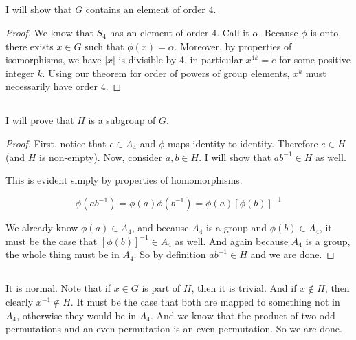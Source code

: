 \documentclass[a4paper,12pt]{article}
\numberwithin{equation}{section}
\begin{document}
\subsection{}
I will show that $G$ contains an element of order 4.

\begin{proof}
We know that $S_4$ has an element of order 4. Call it $\alpha$. Because $\phi$ is onto, there exists $x \in G$ such that $\phi(x) = \alpha$. Moreover, by properties of isomorphisms, we have $|x|$ is divisible by 4, in particular $x^{4k} = e$ for some positive integer $k$. Using our theorem for order of powers of group elements, $x^k$ must necessarily have order 4.
\end{proof}

\subsection{}

I will prove that $H$ is a subgroup of $G$.
\begin{proof}
First, notice that $e \in A_4$ and $\phi$ maps identity to identity. Therefore $e \in H$ (and $H$ is non-empty). Now, consider $a, b \in H$. I will show that $ab^{-1} \in H$ as well.

This is evident simply by properties of homomorphisms.

\begin{equation}
\phi(ab^{-1}) = \phi(a)\phi(b^{-1}) = \phi(a)[\phi(b)]^{-1}
\end{equation}

We already know $\phi(a) \in A_4$, and because $A_4$ is a group and $\phi(b) \in A_4$, it must be the case that $[\phi(b)]^{-1} \in A_4$ as well. And again because $A_4$ is a group, the whole thing must be in $A_4$. So by definition $ab^{-1} \in H$ and we are done.

\end{proof}

\subsection{}

It is normal. Note that if $x \in G$ is part of $H$, then it is trivial. And if $x \notin H$, then clearly $x^{-1} \notin H$. It must be the case that both are mapped to something not in $A_4$, otherwise they would be in $A_4$. And we know that the product of two odd permutations and an even permutation is an even permutation. So we are done.
\end{document}
